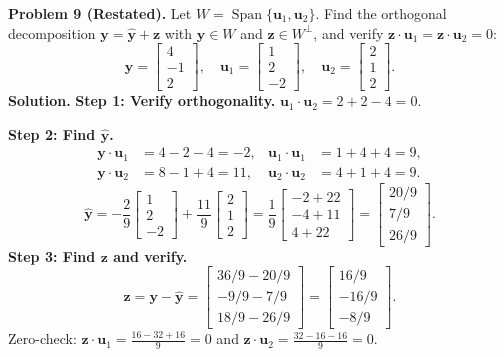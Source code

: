 \documentclass[11pt, letterpaper]{article}
\theoremstyle{definition}
\theoremstyle{remark}
\begin{document}
\medskip
\textbf{Problem 9 (Restated).} Let $W = \operatorname{Span}\{\mathbf{u}_1, \mathbf{u}_2\}$. Find the orthogonal decomposition $\mathbf{y} = \hat{\mathbf{y}} + \mathbf{z}$ with $\hat{\mathbf{y}} \in W$ and $\mathbf{z} \in W^\perp$, and verify $\mathbf{z} \cdot \mathbf{u}_1 = \mathbf{z} \cdot \mathbf{u}_2 = 0$:
\[
\mathbf{y} = \begin{bmatrix} 4 \\ -1 \\ 2 \end{bmatrix}, \quad \mathbf{u}_1 = \begin{bmatrix} 1 \\ 2 \\ -2 \end{bmatrix}, \quad \mathbf{u}_2 = \begin{bmatrix} 2 \\ 1 \\ 2 \end{bmatrix}.
\]
\textbf{Solution.}
\textbf{Step 1: Verify orthogonality.} $\mathbf{u}_1 \cdot \mathbf{u}_2 = 2 + 2 - 4 = 0$.

\textbf{Step 2: Find $\hat{\mathbf{y}}$.}
\begin{align*}
\mathbf{y} \cdot \mathbf{u}_1 &= 4 - 2 - 4 = -2, & \mathbf{u}_1 \cdot \mathbf{u}_1 &= 1 + 4 + 4 = 9, \\
\mathbf{y} \cdot \mathbf{u}_2 &= 8 - 1 + 4 = 11, & \mathbf{u}_2 \cdot \mathbf{u}_2 &= 4 + 1 + 4 = 9.
\end{align*}
\[
\hat{\mathbf{y}} = -\frac{2}{9}\begin{bmatrix} 1 \\ 2 \\ -2 \end{bmatrix} + \frac{11}{9}\begin{bmatrix} 2 \\ 1 \\ 2 \end{bmatrix} = \frac{1}{9}\begin{bmatrix} -2 + 22 \\ -4 + 11 \\ 4 + 22 \end{bmatrix} = \begin{bmatrix} 20/9 \\ 7/9 \\ 26/9 \end{bmatrix}.
\]
\textbf{Step 3: Find $\mathbf{z}$ and verify.}
\[
\mathbf{z} = \mathbf{y} - \hat{\mathbf{y}} = \begin{bmatrix} 36/9 - 20/9 \\ -9/9 - 7/9 \\ 18/9 - 26/9 \end{bmatrix} = \begin{bmatrix} 16/9 \\ -16/9 \\ -8/9 \end{bmatrix}.
\]
Zero-check: $\mathbf{z}\cdot\mathbf{u}_1 = \frac{16 - 32 + 16}{9} = 0$ and $\mathbf{z}\cdot\mathbf{u}_2 = \frac{32 - 16 - 16}{9} = 0$.
\end{document}
